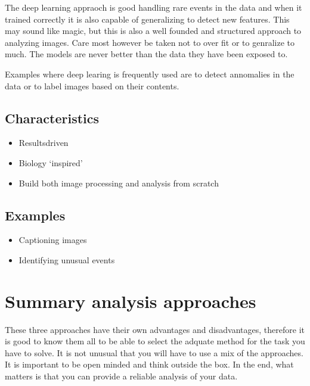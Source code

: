 \documentclass[letterpaper,10pt,english]{sphinxmanual}
\begin{document}
\sphinxAtStartPar
The deep learning appraoch is good handling rare events in the data and when it trained correctly it is also capable of generalizing to detect new features. This may sound like magic, but this is also a well founded and structured approach to analyzing images. Care most however be taken not to over fit or to genralize to much. The models are never better than the data they have been exposed to.

\sphinxAtStartPar
Examples where deep learing is frequently used are to detect annomalies in the data or to label images based on their contents.




\subsection{Characteristics}
\label{\detokenize{01-Introduction:id3}}\begin{itemize}
\item {} 
\sphinxAtStartPar
Results\sphinxhyphen{}driven

\item {} 
\sphinxAtStartPar
Biology ‘inspired’

\item {} 
\sphinxAtStartPar
Build both image processing and analysis from scratch

\end{itemize}


\subsection{Examples}
\label{\detokenize{01-Introduction:id4}}\begin{itemize}
\item {} 
\sphinxAtStartPar
Captioning images

\item {} 
\sphinxAtStartPar
Identifying unusual events

\end{itemize}




\section{Summary analysis approaches}
\label{\detokenize{01-Introduction:summary-analysis-approaches}}
\sphinxAtStartPar
These three approaches have their own advantages and disadvantages, therefore it is good to know them all to be able to select the adquate method for the task you have to solve. It is not unusual that you will have to use a mix of the approaches. It is important to be open minded and think outside the box. In the end, what matters is that you can provide a reliable analysis of your data.
\end{document}
